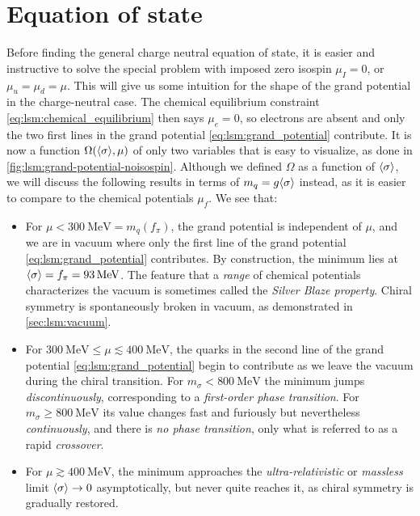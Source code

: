 \pagebreak
\section{Equation of state}

Before finding the general charge neutral equation of state,
it is easier and instructive to solve the special problem with imposed zero isospin $\mu_I=0$, or $\mu_u=\mu_d=\mu$.
This will give us some intuition for the shape of the grand potential in the charge-neutral case.
The chemical equilibrium constraint \eqref{eq:lsm:chemical_equilibrium} then says $\mu_e=0$,
so electrons are absent and only the two first lines in the grand potential \eqref{eq:lsm:grand_potential} contribute.
It is now a function $\Omega(\langle \sigma \rangle,\mu)$ of only two variables that is easy to visualize, as done in \cref{fig:lsm:grand-potential-noisospin}.
Although we defined $\Omega$ as a function of $\langle \sigma \rangle$, we will discuss the following results in terms of $m_q = g \langle \sigma \rangle$ instead,
as it is easier to compare to the chemical potentials $\mu_f$.
We see that:
\begin{itemize}
\item For $\mu < \SI{300}{\mega\electronvolt} = m_q(f_\pi)$,
      the grand potential is independent of $\mu$,
      and we are in vacuum where only the first line of the grand potential \eqref{eq:lsm:grand_potential} contributes.
      By construction, the minimum lies at $\langle \sigma \rangle = f_\pi = \SI{93}{\mega\electronvolt}$.
      The feature that a \emph{range} of chemical potentials characterizes the vacuum is sometimes called the \emph{Silver Blaze property}.
      Chiral symmetry is spontaneously broken in vacuum, as demonstrated in \cref{sec:lsm:vacuum}.
\item For $\SI{300}{\mega\electronvolt} \leq \mu \lesssim \SI{400}{\mega\electronvolt}$,
      the quarks in the second line of the grand potential \eqref{eq:lsm:grand_potential} begin to contribute as we leave the vacuum during the chiral transition.
      For $m_\sigma <    \SI{800}{\mega\electronvolt}$ the minimum jumps \emph{discontinuously}, corresponding to a \emph{first-order phase transition}.
      For $m_\sigma \geq \SI{800}{\mega\electronvolt}$ its value changes fast and furiously but nevertheless \emph{continuously},
      and there is \emph{no phase transition}, only what is referred to as a rapid \emph{crossover}.
\item For $\mu \gtrsim \SI{400}{\mega\electronvolt}$,
      the minimum approaches the \emph{ultra-relativistic} or \emph{massless} limit $\langle \sigma \rangle \rightarrow 0$ asymptotically,
      but never quite reaches it,
      as chiral symmetry is gradually restored.
\end{itemize}

